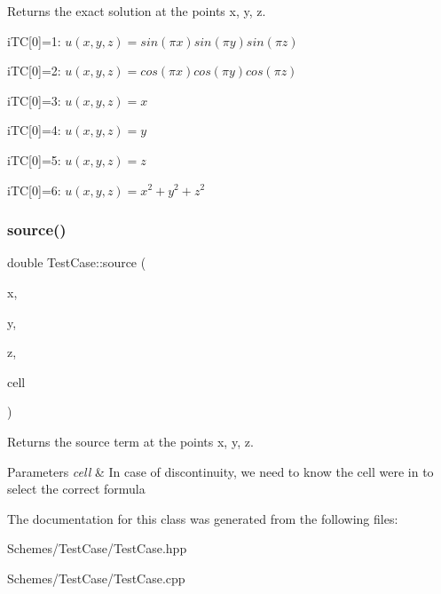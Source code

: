 Returns the exact solution at the points x, y, z. 

i\+TC\mbox{[}0\mbox{]}=1\+: $u(x,y,z)=sin(\pi x) sin(\pi y) sin (\pi z)$

i\+TC\mbox{[}0\mbox{]}=2\+: $u(x,y,z)=cos(\pi x) cos(\pi y) cos(\pi z)$

i\+TC\mbox{[}0\mbox{]}=3\+: $u(x,y,z)= x$

i\+TC\mbox{[}0\mbox{]}=4\+: $u(x,y,z)= y$

i\+TC\mbox{[}0\mbox{]}=5\+: $u(x,y,z)= z$

i\+TC\mbox{[}0\mbox{]}=6\+: $u(x,y,z)= x^2+y^2+z^2$ \mbox{\label{classTestCase_a7e745a0df9fcc771962c48145e230965}} 
\subsubsection{\texorpdfstring{source()}{source()}}
{\footnotesize\ttfamily double Test\+Case\+::source (\begin{DoxyParamCaption}\item[{const double}]{x,  }\item[{const double}]{y,  }\item[{const double}]{z,  }\item[{const \hyperlink{classHArDCore3D_1_1Cell}{Cell} $\ast$}]{cell }\end{DoxyParamCaption})}



Returns the source term at the points x, y, z. 


\begin{DoxyParams}{Parameters}
{\em cell} & In case of discontinuity, we need to know the cell we\textquotesingle{}re in to select the correct formula \\
\hline
\end{DoxyParams}


The documentation for this class was generated from the following files\+:\begin{DoxyCompactItemize}
\item 
Schemes/\+Test\+Case/Test\+Case.\+hpp\item 
Schemes/\+Test\+Case/Test\+Case.\+cpp\end{DoxyCompactItemize}
